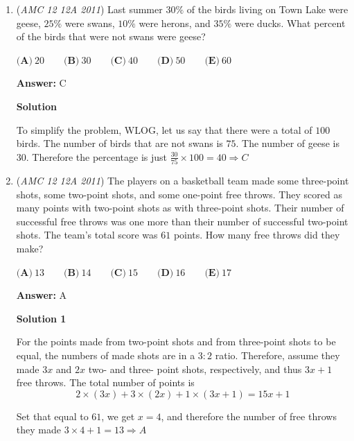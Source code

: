 \begin{enumerate}
 


 If you want to simplify the problem even more, just imagine/assume that only $1$ fifth grader existed. Then you can simply get rid of the variables.

 


 


	\item (\textit{AMC 12 12A 2011}) Last summer $30\%$ of the birds living on Town Lake were geese, $25\%$ were swans, $10\%$ were herons, and $35\%$ were ducks. What percent of the birds that were not swans were geese?


 $\textbf{(A)}\ 20 \qquad \textbf{(B)}\ 30 \qquad \textbf{(C)}\ 40 \qquad \textbf{(D)}\ 50 \qquad \textbf{(E)}\ 60$

 \textbf{Answer: }C



\textbf{Solution}

To simplify the problem, WLOG, let us say that there were a total of $100$ birds. The number of birds that are not swans is $75$. The number of geese is $30$. Therefore the percentage is just $\frac{30}{75} \times 100 = 40 \Rightarrow \boxed{C}$



	\item (\textit{AMC 12 12A 2011}) The players on a basketball team made some three-point shots, some two-point shots, and some one-point free throws. They scored as many points with two-point shots as with three-point shots. Their number of successful free throws was one more than their number of successful two-point shots. The team's total score was $61$ points. How many free throws did they make?


 $\textbf{(A)}\ 13 \qquad \textbf{(B)}\ 14 \qquad \textbf{(C)}\ 15 \qquad \textbf{(D)}\ 16 \qquad \textbf{(E)}\ 17$

 \textbf{Answer: }A



\textbf{Solution 1}

For the points made from two-point shots and from three-point shots to be equal, the numbers of made shots are in a $3:2$ ratio. Therefore, assume they made $3x$ and $2x$ two- and three- point shots, respectively, and thus $3x+1$ free throws. The total number of points is 
 \[2 \times (3x) + 3 \times (2x) + 1 \times (3x+1) = 15x+1\]

 Set that equal to $61$, we get $x = 4$, and therefore the number of free throws they made $3 \times 4 + 1 = 13 \Rightarrow \boxed{A}$





\end{enumerate}
